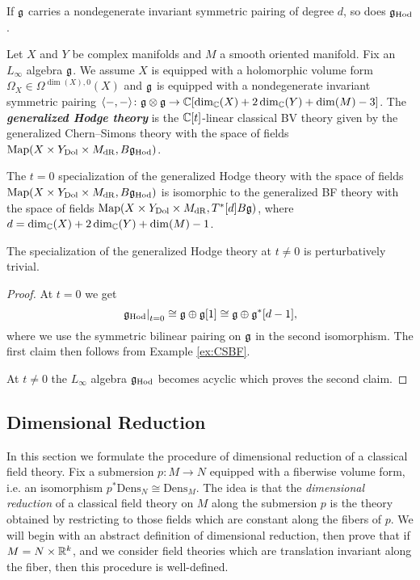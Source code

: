 \documentclass[10pt, oneside]{article}
\newcommand{\Dens}{\mathrm{Dens}}
\newcommand{\Hod}{\mathrm{Hod}}
\newcommand{\defterm}[1]{\textbf{\emph{#1}}}
\begin{document}
If $\mathfrak g$ carries a nondegenerate invariant symmetric pairing of degree $d$, so does $\fg_{\Hod}$.

\begin{definition} \label{Hodge_family_def}
Let $X$ and $Y$ be complex manifolds and $M$ a smooth oriented manifold. Fix an $L_\infty$ algebra $\mathfrak g$. We assume $X$ is equipped with a holomorphic volume form $\Omega_X \in\Omega^{\dim(X), 0}(X)$ and $\mathfrak g$ is equipped with a nondegenerate invariant symmetric pairing $\langle-, -\rangle\colon \mathfrak g\otimes\mathfrak g\rightarrow \mathbb C[\dim_\mathbb C(X) + 2\dim_\mathbb C(Y) + \dim(M) - 3]$. The \defterm{generalized Hodge theory} is the $\mathbb C[t]$-linear classical BV theory given by the generalized Chern--Simons theory with the space of fields $\map(X\times Y_{\mr{Dol}}\times M_{\mr{dR}}, B \fg_\Hod)$.
\end{definition}

\begin{prop}
The $t=0$ specialization of the generalized Hodge theory with the space of fields $\map(X\times Y_{\mr{Dol}}\times M_{\mr{dR}}, B \fg_\Hod)$ is isomorphic to the generalized BF theory with the space of fields $\operatorname{Map}(X\times Y_{\mathrm{Dol}}\times M_{\mathrm{dR}}, T^*[d] B \mathfrak g)$, where $d = \dim_\mathbb C(X) + 2\dim_\mathbb C(Y) + \dim(M) - 1$.

The specialization of the generalized Hodge theory at $t\neq 0$ is perturbatively trivial.
\label{prop:Hodgetheoryspecialization}
\end{prop}

\begin{proof}
At $t=0$ we get
\[\left.\fg_\Hod\right|_{t=0}\cong \fg\oplus \fg[1]\cong \fg\oplus \fg^*[d-1],\]
where we use the symmetric bilinear pairing on $\mathfrak g$ in the second isomorphism. The first claim then follows from Example \ref{ex:CSBF}.

At $t\neq 0$ the $L_\infty$ algebra $\fg_\Hod$ becomes acyclic which proves the second claim.
\end{proof}


\subsection{Dimensional Reduction} \label{dim_red_section}

In this section we formulate the procedure of dimensional reduction of a classical field theory. Fix a submersion $p\colon M\rightarrow N$ equipped with a fiberwise volume form, i.e. an isomorphism $p^*\Dens_N\cong \Dens_M$.  The idea is that the \emph{dimensional reduction} of a classical field theory on $M$ along the submersion $p$ is the theory obtained by restricting to those fields which are constant along the fibers of $p$.  We will begin with an abstract definition of dimensional reduction, then prove that if $M = N \times \mathbb R^k$, and we consider field theories which are translation invariant along the fiber, then this procedure is well-defined.
\end{document}
